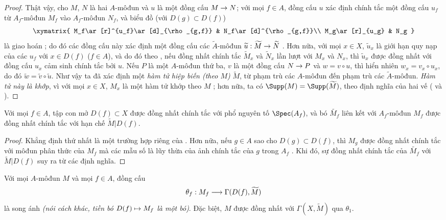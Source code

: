 \documentclass[oneside]{amsart}
\makeatletter
\newcommand{\ega@arrow}[2]{\mathchoice{#1}{#2}{#2}{#2}}
\let\ega@shortmapsto\mapsto
\renewcommand{\to}{\ega@arrow{\longrightarrow}{\rightarrow}}
\renewcommand{\mapsto}{\ega@arrow{\longmapsto}{\ega@shortmapsto}}
\newcommand{\oldpage}[2][]{{\marginnote{\normalfont\textbf{#1}~|~#2}}\ignorespaces}
\let\EGAOriginalLabel\label
\renewcommand{\label}[1]{\phantomsection\EGAOriginalLabel{#1}}
\makeatother
\begin{document}
\begin{proof}
Thật vậy, cho $M$, $N$ là hai $A$-môđun và $u$ là một đồng cấu $M\to N$;
với mọi $f\in A$, đồng cấu $u$ xác định chính tắc một đồng cấu $u_f$ từ $A_f$-môđun $M_f$ vào $A_f$-môđun $N_f$, và biểu đồ (với $D(g)\subset D(f)$)
\[
  \xymatrix{
    M_f\ar[r]^{u_f}\ar[d]_{\rho_{g,f}} & N_f\ar[d]^{\rho_{g,f}}\\
    M_g\ar[r]_{u_g} & N_g
  }
\]
là giao hoán ;
do đó các đồng cấu này xác định một đồng cấu các $\widetilde{A}$-môđun $\widetilde{u}:\widetilde{M}\to\widetilde{N}$ .
Hơn nữa, với mọi $x\in X$, $\widetilde{u}_x$ là giới hạn quy nạp của các $u_f$ với $x\in D(f)$ ($f\in A$), và do đó theo , nếu đồng nhất chính tắc $\widetilde{M}_x$ và $\widetilde{N}_x$ lần lượt với $M_x$ và $N_x$, thì $\widetilde{u}_x$ được đồng nhất với đồng cấu $u_x$ cảm sinh chính tắc bởi $u$.
Nếu $P$ là một $A$-môđun thứ ba, $v$ là một đồng cấu $N\to P$ và $w=v\circ u$, thì hiển nhiên $w_x=v_x\circ u_x$, do đó $\widetilde{w}=\widetilde{v}\circ\widetilde{u}$.
Như vậy ta đã xác định một \emph{hàm tử hiệp biến (theo $M$)} $\widetilde{M}$, từ phạm trù các $A$-môđun đến phạm trù các $\widetilde{A}$-môđun.
\emph{Hàm tử này là khớp}, vì với mọi $x\in X$, $M_x$ là một hàm tử khớp theo $M$ ;
hơn nữa, ta có $\Supp(M)=\Supp(\widetilde{M})$, theo định nghĩa của hai vế ( và ).
\end{proof}

\oldpage[I]{86}
\begin{proposition}[1.3.6]
\label{I.1.3.6}
Với mọi $f\in A$, tập con mở $D(f)\subset X$ được đồng nhất chính tắc với phổ nguyên tố $\Spec(A_f)$, và bó $\widetilde{M_f}$ liên kết với $A_f$-môđun $M_f$ được đồng nhất chính tắc với hạn chế $\widetilde{M}|D(f)$.
\end{proposition}

\begin{proof}
Khẳng định thứ nhất là một trường hợp riêng của .
Hơn nữa, nếu $g\in A$ sao cho $D(g)\subset D(f)$, thì $M_g$ được đồng nhất chính tắc với môđun phân thức của $M_f$ mà các mẫu số là lũy thừa của ảnh chính tắc của $g$ trong $A_f$ .
Khi đó, sự đồng nhất chính tắc của $\widetilde{M_f}$ với $\widetilde{M}|D(f)$ suy ra từ các định nghĩa.
\end{proof}

\begin{theorem}[1.3.7]
\label{I.1.3.7}
Với mọi $A$-môđun $M$ và mọi $f\in A$, đồng cấu
\[
  \theta_f:M_f\to\Gamma(D(f),\widetilde{M})
\]
là song ánh \emph{(nói cách khác, tiền bó $D(f)\mapsto M_f$ là một \emph{bó})}.
Đặc biệt, $M$ được đồng nhất với $\Gamma(X,\widetilde{M})$ qua $\theta_1$.
\end{theorem}
\end{document}

